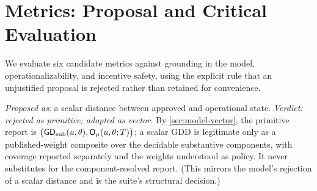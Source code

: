 \section{Metrics: Proposal and Critical Evaluation}
\label{sec:metrics}

We evaluate six candidate metrics against grounding in the model,
operationalizability, and incentive safety, using the explicit rule that an
unjustified proposal is rejected rather than retained for convenience.

\begin{metricdef}
\label{met:gdd}
\emph{Proposed as}: a scalar distance between approved and operational
state. \emph{Verdict: rejected as primitive; adopted as vector.} By
\cref{sec:model-vector}, the primitive report is
$\bigl(\mathsf{GD}_{\mathrm{sub}}(u,\theta),\mathsf{O}_{\mu}(u,\theta;T)\bigr)$; a scalar GDD is legitimate only as a
published-weight composite over the decidable substantive components, with
coverage reported separately and the weights understood as policy. It never
substitutes for the component-resolved report. (This mirrors the model's
rejection of a scalar distance and is the suite's structural decision.)
\end{metricdef}

